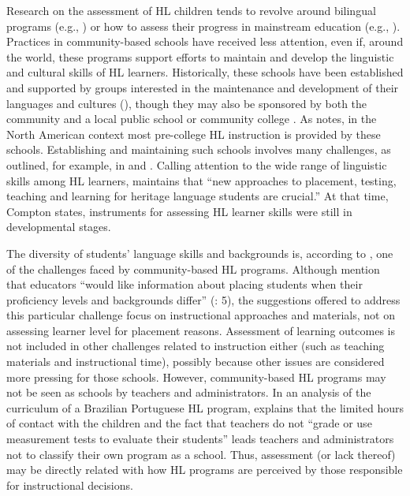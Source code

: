 \documentclass[output=paper]{langscibook}
\begin{document}
  Research on the assessment of HL children tends to revolve around bilingual programs (e.g., \citealt{Lucero2018}) or how to assess their progress in mainstream education (e.g., \citealt{Gonzalez2012}). Practices in community-based schools have received less attention, even if, around the world, these programs support efforts to maintain and develop the linguistic and cultural skills of HL learners. Historically, these schools have been established and supported by groups interested in the maintenance and development of their languages and cultures (\citealt{BradunasTopping1988}), though they may also be sponsored by both the community and a local public school or community college \citep{Compton2001}. As \citet{Douglas2005} notes, in the North American context most pre-college HL instruction is provided by these schools. Establishing and maintaining such schools involves many challenges, as outlined, for example, in \citet{Compton2001} and \citet{LiuEtAl2011}. Calling attention to the wide range of linguistic skills among HL learners, \citet[155]{Compton2001} maintains that “new approaches to placement, testing, teaching and learning for heritage language students are crucial.” At that time, Compton states, instruments for assessing HL learner skills were still in developmental stages.

The diversity of students’ language skills and backgrounds is, according to \citet{LiuEtAl2011}, one of the challenges faced by community-based HL programs. Although \citeauthor{LiuEtAl2011} mention that educators “would like information about placing students when their proficiency levels and backgrounds differ” (\citealt{LiuEtAl2011}: 5), the suggestions offered to address this particular challenge focus on instructional approaches and materials, not on assessing learner level for placement reasons. Assessment of learning outcomes is not included in other challenges related to instruction either (such as teaching materials and instructional time), possibly because other issues are considered more pressing for those schools. However, community-based HL programs may not be seen as schools by teachers and administrators. In an analysis of the curriculum of a Brazilian Portuguese HL program, \citet[83]{Boruchowski2014} explains that the limited hours of contact with the children and the fact that teachers do not “grade or use measurement tests to evaluate their students” leads teachers and administrators not to classify their own program as a school. Thus, assessment (or lack thereof) may be directly related with how HL programs are perceived by those responsible for instructional decisions.
\end{document}
